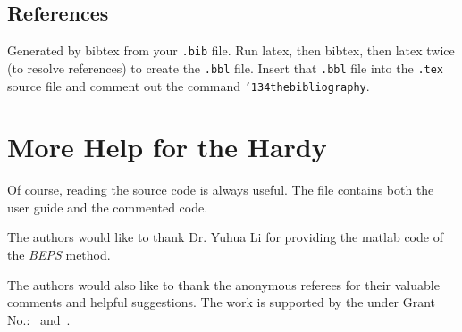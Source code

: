 \documentclass[sigconf]{acmart}
\begin{document}
\subsection{References}

Generated by bibtex from your \texttt{.bib} file.  Run latex, then
bibtex, then latex twice (to resolve references) to create the
\texttt{.bbl} file.  Insert that \texttt{.bbl} file into the
\texttt{.tex} source file and comment out the command
\texttt{{\char'134}thebibliography}.


\section{More Help for the Hardy}

Of course, reading the source code is always useful.  The file
 contains both the user guide and the commented code.

\begin{acks}

  The authors would like to thank Dr. Yuhua Li for providing the
  matlab code of the \textit{BEPS} method.

  The authors would also like to thank the anonymous referees for
  their valuable comments and helpful suggestions. The work is
  supported by the  under Grant
  No.:~
  and~.

\end{acks}


 
\end{document}
